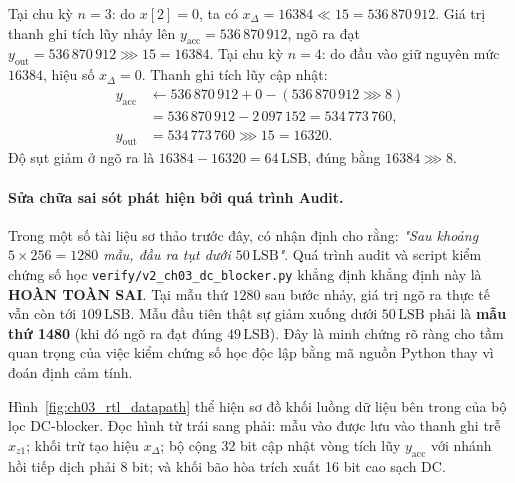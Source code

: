 Tại chu kỳ $n = 3$: do $x[2] = 0$, ta có $x_{\Delta} = 16384 \ll 15 = 536\,870\,912$. Giá trị thanh ghi tích lũy nhảy lên $y_{\mathrm{acc}} = 536\,870\,912$, ngõ ra đạt $y_{\mathrm{out}} = 536\,870\,912 \ggg 15 = 16384$.
Tại chu kỳ $n = 4$: do đầu vào giữ nguyên mức $16384$, hiệu số $x_{\Delta} = 0$. Thanh ghi tích lũy cập nhật:
\begin{align*}
y_{\mathrm{acc}} &\leftarrow 536\,870\,912 + 0 - (536\,870\,912 \ggg 8) \\
&= 536\,870\,912 - 2\,097\,152 = 534\,773\,760,\\
y_{\mathrm{out}} &= 534\,773\,760 \ggg 15 = 16320.
\end{align*}
Độ sụt giảm ở ngõ ra là $16384 - 16320 = 64\,\text{LSB}$, đúng bằng $16384 \ggg 8$.

\paragraph{Sửa chữa sai sót phát hiện bởi quá trình Audit.}
Trong một số tài liệu sơ thảo trước đây, có nhận định cho rằng: \emph{"Sau khoảng $5\times 256 = 1280$ mẫu, đầu ra tụt dưới $50\,\text{LSB}$"}. Quá trình audit và script kiểm chứng số học \texttt{verify/v2\_ch03\_dc\_blocker.py} khẳng định khẳng định này là \textbf{HOÀN TOÀN SAI}. Tại mẫu thứ $1280$ sau bước nhảy, giá trị ngõ ra thực tế vẫn còn tới $109\,\text{LSB}$. Mẫu đầu tiên thật sự giảm xuống dưới $50\,\text{LSB}$ phải là \textbf{mẫu thứ 1480} (khi đó ngõ ra đạt đúng $49\,\text{LSB}$). Đây là minh chứng rõ ràng cho tầm quan trọng của việc kiểm chứng số học độc lập bằng mã nguồn Python thay vì đoán định cảm tính.

Hình~\ref{fig:ch03_rtl_datapath} thể hiện sơ đồ khối luồng dữ liệu bên trong của bộ lọc DC-blocker. Đọc hình từ trái sang phải: mẫu vào được lưu vào thanh ghi trễ $x_{z1}$; khối trừ tạo hiệu $x_{\Delta}$; bộ cộng 32 bit cập nhật vòng tích lũy $y_{\mathrm{acc}}$ với nhánh hồi tiếp dịch phải 8 bit; và khối bão hòa trích xuất 16 bit cao sạch DC.

